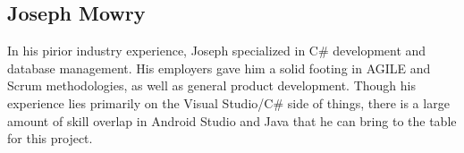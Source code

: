 \subsection{Joseph Mowry}

In his pirior industry experience, Joseph specialized in C\# development and database management. His employers gave him a solid footing in AGILE and Scrum methodologies, as well as general product development. Though his experience lies primarily on the Visual Studio/C\# side of things, there is a large amount of skill overlap in Android Studio and Java that he can bring to the table for this project.





